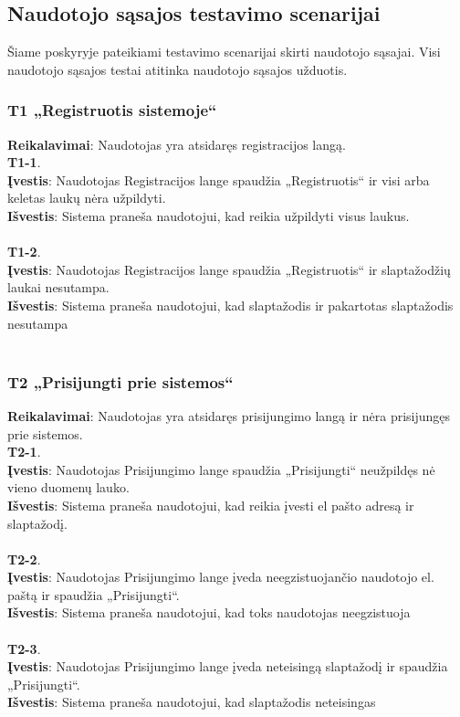 \documentclass{VUMIFPSbakalaurinis}
\begin{document}
\subsection{Naudotojo sąsajos testavimo scenarijai}
Šiame poskyryje pateikiami testavimo scenarijai skirti naudotojo sąsajai. Visi naudotojo sąsajos testai atitinka naudotojo sąsajos užduotis.

\subsubsection{T1 „Registruotis sistemoje“}
\textbf{Reikalavimai}: Naudotojas yra atsidaręs registracijos langą. \\
\textbf{T1-1}. \\
\textbf{Įvestis}: Naudotojas Registracijos lange spaudžia „Registruotis“ ir visi arba keletas laukų nėra užpildyti. \\
\textbf{Išvestis}: Sistema praneša naudotojui, kad reikia užpildyti visus laukus. \\ \\
\textbf{T1-2}. \\
\textbf{Įvestis}: Naudotojas Registracijos lange spaudžia „Registruotis“ ir slaptažodžių laukai nesutampa. \\
\textbf{Išvestis}: Sistema praneša naudotojui, kad slaptažodis ir pakartotas slaptažodis nesutampa\\ \\

\subsubsection{T2 „Prisijungti prie sistemos“}
\textbf{Reikalavimai}: Naudotojas yra atsidaręs prisijungimo langą ir nėra prisijungęs  prie sistemos. \\
\textbf{T2-1}. \\
\textbf{Įvestis}: Naudotojas Prisijungimo lange spaudžia „Prisijungti“ neužpildęs nė vieno duomenų lauko. \\
\textbf{Išvestis}: Sistema praneša naudotojui, kad reikia įvesti el pašto adresą ir slaptažodį. \\ \\
\textbf{T2-2}. \\
\textbf{Įvestis}: Naudotojas Prisijungimo lange įveda neegzistuojančio naudotojo el. paštą ir spaudžia „Prisijungti“. \\
\textbf{Išvestis}: Sistema praneša naudotojui, kad toks naudotojas neegzistuoja\\ \\
\textbf{T2-3}. \\
\textbf{Įvestis}: Naudotojas Prisijungimo lange įveda neteisingą slaptažodį ir spaudžia „Prisijungti“. \\
\textbf{Išvestis}: Sistema praneša naudotojui, kad slaptažodis neteisingas\\ \\
\end{document}
